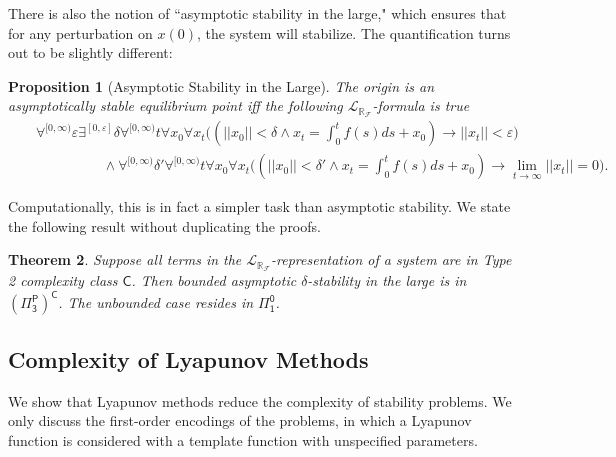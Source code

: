 \documentclass[10pt]{article}
\theoremstyle{plain}
\newtheorem{theorem}{Theorem}[section]
\newtheorem{proposition}[theorem]{Proposition}
\theoremstyle{definition}
\newcommand{\lrf}{\mathcal{L}_{\mathbb{R}_{\mathcal{F}}}}
\begin{document}
There is also the notion of ``asymptotic stability in the large," which ensures that for any perturbation on $x(0)$, the system will stabilize. The quantification turns out to be slightly different:
\begin{proposition}[Asymptotic Stability in the Large]
The origin is an asymptotically stable equilibrium point iff the following $\lrf$-formula is true
\begin{eqnarray*}
& &\forall^{[0,\infty)} \varepsilon\exists^{[0,\varepsilon]} \delta\forall^{[0,\infty)} t\forall x_0\forall x_t\Big((||x_0||<\delta \wedge x_t = \int_0^t f(s)ds + x_0 )\rightarrow ||x_t||<\varepsilon\Big)\\
& &\hspace{2cm}\wedge \forall^{[0,\infty)} \delta'  \forall^{[0,\infty)} t\forall x_0\forall x_t\Big( (||x_0||<\delta'\wedge x_t = \int_0^t f(s)ds + x_0 )\rightarrow \lim_{t\rightarrow \infty} ||x_t|| = 0\Big). 
\end{eqnarray*}
\end{proposition}
Computationally, this is in fact a simpler task than asymptotic stability. We state the following result without duplicating the proofs. 
\begin{theorem}
Suppose all terms in the $\lrf$-representation of a system are in Type 2 complexity class $\mathsf{C}$. Then bounded asymptotic $\delta$-stability in the large is in $\mathsf{(\Pi^P_3)^C}$. The unbounded case resides in $\mathsf{\Pi^0_1}$.  
\end{theorem}


\subsection{Complexity of Lyapunov Methods}

We show that Lyapunov methods reduce the complexity of stability problems. We only discuss the first-order encodings of the problems, in which a Lyapunov function is considered with a template function with unspecified parameters. 
\end{document}
